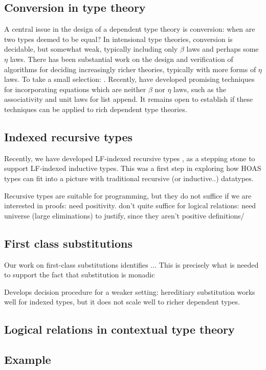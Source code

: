 \documentclass{article}
\newcommand{\LONGVERSION}[1]{{\color{light-gray}#1}}
\begin{document}
\subsection{Conversion in type theory}
A central issue in the design of a dependent type theory is
conversion: when are two types deemed to be equal? In
intensional type theories, conversion is decidable, but somewhat
weak, typically including only $\beta$ laws and perhaps some $\eta$
laws. There has been substantial work on the design and verification
of algorithms for deciding increasingly richer theories, typically
with more forms of $\eta$ laws. To take a
small selection: \cite{Coquand91,Harper05,Abel11}. Recently,
\cite{Allais13} have developed promising techniques for incorporating equations
which are neither $\beta$ nor $\eta$ laws, such as the associativity
and unit laws for list append. It remains open to establish if 
these techniques can be applied to rich dependent type theories.

\subsection{Indexed recursive types}
Recently, we have developed LF-indexed recursive types
\citep{Cave12}, as a stepping stone to support LF-indexed inductive
types. This was a first step in exploring how HOAS types can fit
into a picture with traditional recursive (or inductive..) datatypes. 

Recursive types are suitable for programming, but they do not suffice
if we are interested in proofs: need positivity. don't quite suffice
for logical relations: need universe (large eliminations) to justify,
since they aren't positive definitions/
\subsection{First class substitutions}
Our work on first-class substitutions \citep{Cave13} identifies ...
\LONGVERSION{This is precisely what is needed to support the fact that substitution
is monadic \cite{?}}


Develops decision procedure for a weaker setting: hereditiary
substitution works well for indexed types, but it does not scale well
to richer dependent types. 

\subsection{Logical relations in contextual type theory}
\citep{Cave14}
\subsection{Example}
\end{document}
